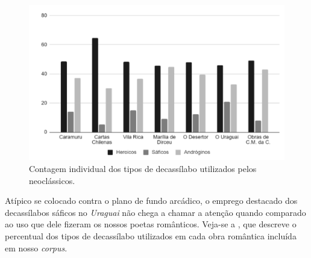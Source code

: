\documentclass[portuguese]{textolivre}
\begin{document}
\begin{figure}[!h]
    \centering
    \begin{minipage}{0.75\linewidth}
    \includegraphics[width=\linewidth]{fig-002.pdf}
    \caption{Contagem individual dos tipos de decassílabo utilizados pelos neoclássicos.}
    \label{fig2}
    \end{minipage}
\end{figure}

Atípico se colocado contra o plano de fundo arcádico, o emprego destacado dos decassílabos sáficos no \textit{Uraguai} não chega a chamar a atenção quando comparado ao uso que dele fizeram os nossos poetas românticos. Veja-se a , que descreve o percentual dos tipos de decassílabo utilizados em cada obra romântica incluída em nosso \textit{corpus}.
\end{document}
